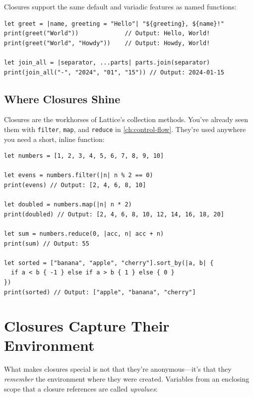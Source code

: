 Closures support the same default and variadic features as named functions:

\begin{lstlisting}[language=Lattice, caption={Closures with defaults and variadics}]
let greet = |name, greeting = "Hello"| "${greeting}, ${name}!"
print(greet("World"))             // Output: Hello, World!
print(greet("World", "Howdy"))    // Output: Howdy, World!

let join_all = |separator, ...parts| parts.join(separator)
print(join_all("-", "2024", "01", "15")) // Output: 2024-01-15
\end{lstlisting}

\subsection{Where Closures Shine}\label{sec:closures-usage}

Closures are the workhorses of Lattice's collection methods. You've already seen them with \lstinline|filter|, \lstinline|map|, and \lstinline|reduce| in \cref{ch:control-flow}. They're used anywhere you need a short, inline function:

\begin{lstlisting}[language=Lattice, caption={Closures in collection methods}]
let numbers = [1, 2, 3, 4, 5, 6, 7, 8, 9, 10]

let evens = numbers.filter(|n| n % 2 == 0)
print(evens) // Output: [2, 4, 6, 8, 10]

let doubled = numbers.map(|n| n * 2)
print(doubled) // Output: [2, 4, 6, 8, 10, 12, 14, 16, 18, 20]

let sum = numbers.reduce(0, |acc, n| acc + n)
print(sum) // Output: 55

let sorted = ["banana", "apple", "cherry"].sort_by(|a, b| {
  if a < b { -1 } else if a > b { 1 } else { 0 }
})
print(sorted) // Output: ["apple", "banana", "cherry"]
\end{lstlisting}

\section{Closures Capture Their Environment}\label{sec:upvalues}

What makes closures special is not that they're anonymous---it's that they \emph{remember} the environment where they were created. Variables from an enclosing scope that a closure references are called \emph{upvalues}:

